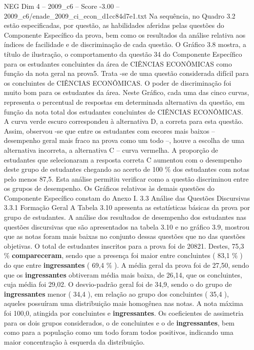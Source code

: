 \begin{textsample}{NEG Dim 4 – 2009\_c6 – Score -3.00 – 2009\_c6/enade\_2009\_ci\_econ\_d1cc84d7e1.txt}
Na sequência, no Quadro 3.2 estão especificadas, por questão, as habilidades aferidas pelas questões do Componente Específico da prova, bem como os resultados da análise relativa aos índices de facilidade e de discriminação de cada questão.
O Gráfico 3.8 mostra, a título de ilustração, o comportamento da questão 34 do Componente Específico para os estudantes concluintes da área de CIÊNCIAS ECONÔMICAS como função da nota geral na prova5.
Trata -se de uma questão considerada difícil para os concluintes de CIÊNCIAS ECONÔMICAS.
O poder de discriminação foi muito bom para os estudantes da área.
Neste Gráfico, cada uma das cinco curvas, representa o percentual de respostas em determinada alternativa da questão, em função da nota total dos estudantes concluintes de CIÊNCIAS ECONÔMICAS.
A curva verde escuro correspondeu à alternativa D, a correta para esta questão.
Assim, observou -se que entre os estudantes com escores mais baixos – desempenho geral mais fraco na prova como um todo –, houve a escolha de uma alternativa incorreta, a alternativa C – curva vermelha.
A proporção de estudantes que selecionaram a resposta correta C aumentou com o desempenho deste grupo de estudantes chegando ao acerto de 100 \% dos estudantes com notas pelo menos 87,5.
Esta análise permitiu verificar como a questão discriminou entre os grupos de desempenho.
Os Gráficos relativos às demais questões do Componente Específico constam do Anexo I. 3.3 Análise das Questões Discursivas 3.3.1 Formação Geral A Tabela 3.10 apresenta as estatísticas básicas da prova por grupo de estudantes.
A análise dos resultados de desempenho dos estudantes nas questões discursivas que são apresentados na tabela 3.10 e no gráfico 3.9, mostrou que as notas foram mais baixas no conjunto dessas questões que no das questões objetivas.
O total de estudantes inscritos para a prova foi de 20821.
Destes, 75,3 \% \textbf{compareceram}, sendo que a presença foi maior entre concluintes ( 83,1 \% ) do que entre \textbf{ingressantes} ( 69,4 \% ).
A média geral da prova foi de 27,50, sendo que os \textbf{ingressantes} obtiveram média mais baixa, de 26,14, que os concluintes, cuja média foi 29,02.
O desvio-padrão geral foi de 34,9, sendo o do grupo de \textbf{ingressantes} menor ( 34,4 ), em relação ao grupo dos concluintes ( 35,4 ), aqueles possuíram uma distribuição mais homogênea nas notas.
A nota máxima foi 100,0, atingida por concluintes e \textbf{ingressantes}.
Os coeficientes de assimetria para os dois grupos considerados, o de concluintes e o de \textbf{ingressantes}, bem como para a população como um todo foram todos positivos, indicando uma maior concentração à esquerda da distribuição.

\end{textsample}
